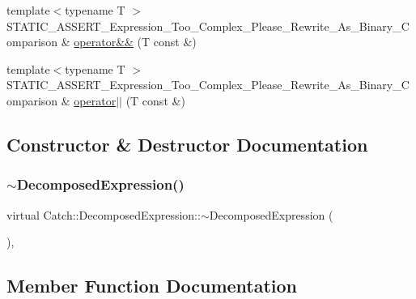 \begin{DoxyCompactItemize}
\item 
{\footnotesize template$<$typename T $>$ }\\S\+T\+A\+T\+I\+C\+\_\+\+A\+S\+S\+E\+R\+T\+\_\+\+Expression\+\_\+\+Too\+\_\+\+Complex\+\_\+\+Please\+\_\+\+Rewrite\+\_\+\+As\+\_\+\+Binary\+\_\+\+Comparison \& \hyperlink{struct_catch_1_1_decomposed_expression_a14d913535796145b39101a16c0c490da}{operator\&\&} (T const \&)
\item 
{\footnotesize template$<$typename T $>$ }\\S\+T\+A\+T\+I\+C\+\_\+\+A\+S\+S\+E\+R\+T\+\_\+\+Expression\+\_\+\+Too\+\_\+\+Complex\+\_\+\+Please\+\_\+\+Rewrite\+\_\+\+As\+\_\+\+Binary\+\_\+\+Comparison \& \hyperlink{struct_catch_1_1_decomposed_expression_ab4800d277290088fea9c594cfdd4f1c7}{operator$\vert$$\vert$} (T const \&)
\end{DoxyCompactItemize}


\subsection{Constructor \& Destructor Documentation}
\mbox{\label{struct_catch_1_1_decomposed_expression_aa627c69bd83582c33a4d4dcac403936c}} 
\subsubsection{\texorpdfstring{$\sim$\+Decomposed\+Expression()}{~DecomposedExpression()}}
{\footnotesize\ttfamily virtual Catch\+::\+Decomposed\+Expression\+::$\sim$\+Decomposed\+Expression (\begin{DoxyParamCaption}{ }\end{DoxyParamCaption})\hspace{0.3cm}{\ttfamily [inline]}, {\ttfamily [virtual]}}



\subsection{Member Function Documentation}
\mbox{\label{struct_catch_1_1_decomposed_expression_a1c458ece47b71f093290dbdf9bb31fdb}} 
